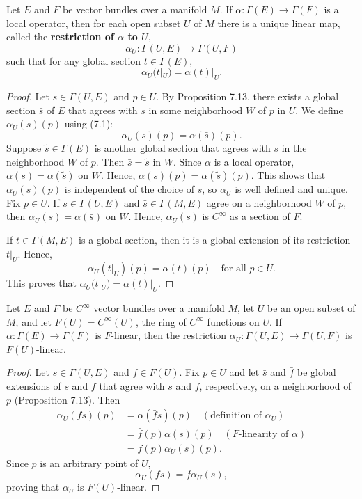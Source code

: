 \begin{example}
\begin{theorem}
Let $E$ and $F$ be vector bundles over a manifold $M$. If $\alpha : \Gamma(E) \to \Gamma(F)$ is a local operator, then for each open subset $U$ of $M$ there is a unique linear map, called the \textbf{restriction of $\alpha$ to $U$},
\[
\alpha_U : \Gamma(U,E) \to \Gamma(U,F)
\]
such that for any global section $t \in \Gamma(E)$,
\[
\alpha_U(t|_U) = \alpha(t)|_U.
\]
\end{theorem}

\begin{proof}
Let $s \in \Gamma(U,E)$ and $p \in U$. By Proposition 7.13, there exists a global section $\bar{s}$ of $E$ that agrees with $s$ in some neighborhood $W$ of $p$ in $U$. We define $\alpha_U(s)(p)$ using (7.1):
\[
\alpha_U(s)(p) = \alpha(\bar{s})(p).
\]
Suppose $\tilde{s} \in \Gamma(E)$ is another global section that agrees with $s$ in the neighborhood $W$ of $p$. Then $\bar{s} = \tilde{s}$ in $W$. Since $\alpha$ is a local operator, $\alpha(\bar{s}) = \alpha(\tilde{s})$ on $W$. Hence, $\alpha(\bar{s})(p) = \alpha(\tilde{s})(p)$. This shows that $\alpha_U(s)(p)$ is independent of the choice of $\bar{s}$, so $\alpha_U$ is well defined and unique. Fix $p \in U$. If $s \in \Gamma(U,E)$ and $\bar{s} \in \Gamma(M,E)$ agree on a neighborhood $W$ of $p$, then $\alpha_U(s) = \alpha(\bar{s})$ on $W$. Hence, $\alpha_U(s)$ is $C^{\infty}$ as a section of $F$.

If $t \in \Gamma(M,E)$ is a global section, then it is a global extension of its restriction $t|_U$. Hence,
\[
\alpha_U(t|_U)(p) = \alpha(t)(p) \quad \text{for all } p \in U.
\]
This proves that $\alpha_U(t|_U) = \alpha(t)|_U$.
\end{proof}

\begin{proposition}
Let $E$ and $F$ be $C^{\infty}$ vector bundles over a manifold $M$, let $U$ be an open subset of $M$, and let $F(U) = C^{\infty}(U)$, the ring of $C^{\infty}$ functions on $U$. If $\alpha : \Gamma(E) \to \Gamma(F)$ is $F$-linear, then the restriction $\alpha_U : \Gamma(U,E) \to \Gamma(U,F)$ is $F(U)$-linear.
\end{proposition}

\begin{proof}
Let $s \in \Gamma(U,E)$ and $f \in F(U)$. Fix $p \in U$ and let $\bar{s}$ and $\bar{f}$ be global extensions of $s$ and $f$ that agree with $s$ and $f$, respectively, on a neighborhood of $p$ (Proposition 7.13). Then
\begin{align*}
\alpha_U(fs)(p) &= \alpha(\bar{f}\bar{s})(p) \quad (\text{definition of } \alpha_U) \\
&= \bar{f}(p)\alpha(\bar{s})(p) \quad (F\text{-linearity of } \alpha) \\
&= f(p)\alpha_U(s)(p).
\end{align*}
Since $p$ is an arbitrary point of $U$,
\[
\alpha_U(fs) = f\alpha_U(s),
\]
proving that $\alpha_U$ is $F(U)$-linear.
\end{proof}


\end{example}
